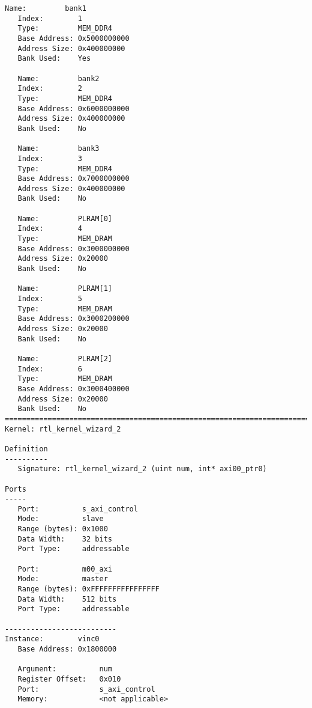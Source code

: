 \begin{center}
\begin{lstlisting}[label=lst:xclbin_info,caption=Файл vinc.xclbin.info]
   Name:         bank1
   Index:        1
   Type:         MEM_DDR4
   Base Address: 0x5000000000
   Address Size: 0x400000000
   Bank Used:    Yes

   Name:         bank2
   Index:        2
   Type:         MEM_DDR4
   Base Address: 0x6000000000
   Address Size: 0x400000000
   Bank Used:    No

   Name:         bank3
   Index:        3
   Type:         MEM_DDR4
   Base Address: 0x7000000000
   Address Size: 0x400000000
   Bank Used:    No

   Name:         PLRAM[0]
   Index:        4
   Type:         MEM_DRAM
   Base Address: 0x3000000000
   Address Size: 0x20000
   Bank Used:    No

   Name:         PLRAM[1]
   Index:        5
   Type:         MEM_DRAM
   Base Address: 0x3000200000
   Address Size: 0x20000
   Bank Used:    No

   Name:         PLRAM[2]
   Index:        6
   Type:         MEM_DRAM
   Base Address: 0x3000400000
   Address Size: 0x20000
   Bank Used:    No
==============================================================================
Kernel: rtl_kernel_wizard_2

Definition
----------
   Signature: rtl_kernel_wizard_2 (uint num, int* axi00_ptr0)

Ports
-----
   Port:          s_axi_control
   Mode:          slave
   Range (bytes): 0x1000
   Data Width:    32 bits
   Port Type:     addressable

   Port:          m00_axi
   Mode:          master
   Range (bytes): 0xFFFFFFFFFFFFFFFF
   Data Width:    512 bits
   Port Type:     addressable

--------------------------
Instance:        vinc0
   Base Address: 0x1800000

   Argument:          num
   Register Offset:   0x010
   Port:              s_axi_control
   Memory:            <not applicable>


\end{lstlisting}
\end{center}
